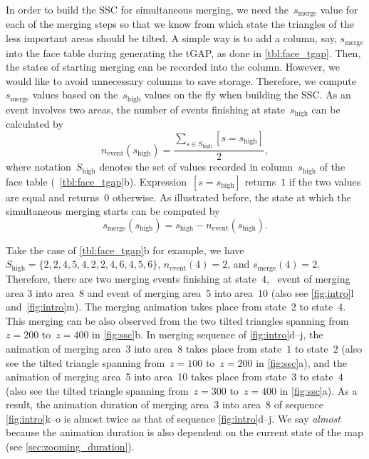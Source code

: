 \documentclass[twocolumn]{svjour3}          %
\begin{document}
In order to build the SSC for simultaneous merging,
we need the~$s_\mathrm{merge}$ value for each of the merging steps
so that we know from which state 
the triangles of the less important areas should be tilted.
A simple way is to add a column, say, $s_\mathrm{merge}$
into the face table during generating the tGAP, 
as done in \tabl\ref{tbl:face_tgap}.
Then, the states of starting merging can be recorded into the column.
However, we would like to avoid unnecessary columns to save storage.
Therefore, we compute~$s_\mathrm{merge}$ values 
based on the~$s_\mathrm{high}$ values
on the fly when building the SSC.
As an event involves two areas,
the number of events finishing at state~$s_\mathrm{high}$ can be calculated by
\begin{equation*}
\label{eq:n_event_state}
n_\mathrm{event} (s_\mathrm{high}) = 
\frac{\sum\limits_{s \in S_\mathrm{high}} [s=s_\mathrm{high}]}{2},
\end{equation*}
where notation~$S_\mathrm{high}$ denotes the set of values
recorded in column~$s_\mathrm{high}$ of the face table
(\eg~\tabl\ref{tbl:face_tgap}b).
Expression~$[s=s_\mathrm{high}]$ returns~$1$ if the two values are equal 
and returns~$0$ otherwise.
As illustrated before, the state at which the simultaneous merging starts 
can be computed by
\begin{equation*}
\label{eq:s_merge_state}
s_\mathrm{merge} (s_\mathrm{high}) = s_\mathrm{high} - n_\mathrm{event} (s_\mathrm{high}).
\end{equation*}



Take the case of \tabl\ref{tbl:face_tgap}b for example,
we have~$S_\mathrm{high} = \{2, 2, 4, 5, 4, 2, 2, 4, 6, 4, 5, 6\}$, 
$n_\mathrm{event} (4) = 2$, and $s_\mathrm{merge} (4) = 2$.
Therefore, there are two merging events finishing at state~$4$,
\ie~event of merging area 3 into area~8 and 
event of merging area~5 into area~10 
(also see \figs\ref{fig:intro}l and~\ref{fig:intro}m).
The merging animation takes place from state~$2$ to state~$4$.
This merging can be also observed from 
the two tilted triangles spanning from~$z = 200$ to~$z = 400$ 
in \fig\ref{fig:ssc}b.
In merging sequence of \figs\ref{fig:intro}d--j, 
the animation of merging area~3 into area~8 
takes place from state~$1$ to state~$2$
(also see the tilted triangle spanning from~$z = 100$ to~$z = 200$ 
in \fig\ref{fig:ssc}a), and 
the animation of merging area~5 into area~10
takes place from state~$3$ to state~$4$
(also see the tilted triangle spanning from~$z = 300$ to~$z = 400$ 
in \fig\ref{fig:ssc}a).
As a result, the animation duration of merging area~3 into area~8 of 
sequence \figs\ref{fig:intro}k--o
is almost twice as that of sequence \figs\ref{fig:intro}d--j.
We say \emph{almost} because the animation duration is also dependent on 
the current state of the map
(see \sect\ref{sec:zooming_duration}).
\end{document}
